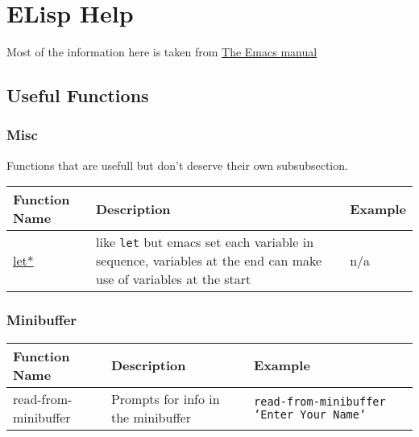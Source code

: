 \documentclass[12pt, letterpaper]{article}
\def\code#1{\texttt{#1}}
\begin{document}
\section{ELisp Help}
Most of the information here is taken from \href{https://www.gnu.org/software/emacs/manual/html_node/elisp/index.html}{The Emacs manual}
\subsection{Useful Functions}

\subsubsection{Misc}
Functions that are usefull but don't deserve their own subsubsection. \\

\begin{tabular} {|L{0.2\textwidth}|L{0.4\textwidth}|L{0.4\textwidth}|}
  \hline
  \textbf{Function Name} &
  \textbf{Description} &
  \textbf{Example} \\\hline\hline
  \href{https://www.gnu.org/software/emacs/manual/html_node/eintr/fwd_002dpara-let.html#fwd_002dpara-let}{let*} & like \code{let} but emacs set each variable in sequence, variables at the end can make use of variables at the start & n/a \\\hline
\end{tabular}

\subsubsection{Minibuffer}

\begin{tabular} {|L{0.2\textwidth}|L{0.4\textwidth}|L{0.4\textwidth}|}
  \hline
  \textbf{Function Name} &
  \textbf{Description} &
  \textbf{Example} \\\hline\hline
  read-from-minibuffer & Prompts for info in the minibuffer & \code{read-from-minibuffer 'Enter Your Name'} \\\hline
\end{tabular}
\end{document}
